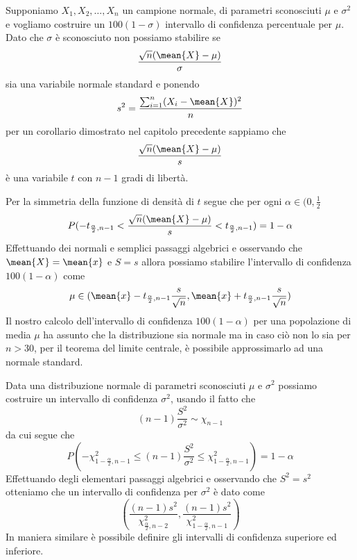 \documentclass[a4paper,12pt, oneside]{book}
\begin{document}
Supponiamo $X_1, X_2, \dots, X_n$ un campione normale, di parametri sconosciuti $\mu$ e $\sigma^2$ e vogliamo costruire
un $100(1 - \sigma)$ intervallo di confidenza percentuale per $\mu$.\newline
Dato che $\sigma$ è sconosciuto non possiamo stabilire se 
\[ \frac{\sqrt{n} (\mean{X} - \mu)}{\sigma} \] 
sia una variabile normale standard e ponendo 
\[ s^2 = \frac{\sum _{i = 1}^n (X_i - \mean{X})^2}{n} \]
per un corollario dimostrato nel capitolo precedente sappiamo che 
\[ \frac{\sqrt{n} (\mean{X} - \mu)}{s} \]
è una variabile $t$ con $n - 1$ gradi di libertà.

Per la simmetria della funzione di densità di $t$ segue che per ogni $\alpha \in (0, \frac{1}{2}$
\[ P(-t_{\frac{\alpha}{2}, n - 1} < \frac{\sqrt{n}(\mean{X} - \mu)}{s} < t_{\frac{\alpha}{2}, n - 1}) = 1 - \alpha \]
Effettuando dei normali e semplici passaggi algebrici e osservando che $\mean{X} = \mean{x}$ e $S = s$ allora 
possiamo stabilire l'intervallo di confidenza $100(1 - \alpha)$ come 
\[ \mu \in (\mean{x} - t_{\frac{\alpha}{2}, n - 1} \frac{s}{\sqrt{n}}, \mean{x} + t_{\frac{\alpha}{2}, n - 1} \frac{s}{\sqrt{n}}) \]
Il nostro calcolo dell'intervallo di confidenza $100(1 - \alpha)$ per una popolazione di media $\mu$ ha assunto che la
distribuzione sia normale ma in caso ciò non lo sia per $n > 30$, per il teorema del limite centrale, è possibile
approssimarlo ad una normale standard.

Data una distribuzione normale di parametri sconosciuti $\mu$ e $\sigma^2$ possiamo costruire un intervallo di
confidenza $\sigma^2$, usando il fatto che 
\[ (n - 1)\frac{S^2}{\sigma^2} \sim \chi_{n - 1} \] 
da cui segue che 
\[ P(-\chi_{1 - \frac{\alpha}{2}, n - 1}^2 \leq (n - 1)\frac{S^2}{\sigma^2} \leq \chi_{1 - \frac{\alpha}{2}, n - 1}^2) = 1 - \alpha \]
Effettuando degli elementari passaggi algebrici e osservando che $S^2 = s^2$ otteniamo che un intervallo di confidenza
per $\sigma^2$ è dato come 
\[ (\frac{(n - 1)s^2}{\chi_{\frac{\alpha}{2}, n - 2}^2}, \frac{(n - 1)s^2}{\chi_{1 - \frac{\alpha}{2}, n - 1}^2}) \]
In maniera similare è possibile definire gli intervalli di confidenza superiore ed inferiore.
\end{document}
